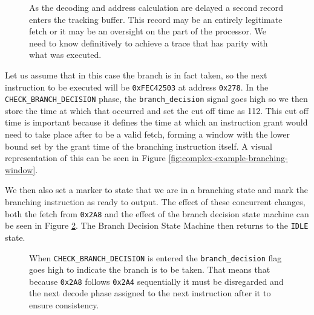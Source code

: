 \begin{figure}[htbp]
	
	\caption{As the decoding and address calculation are delayed a second record enters the tracking buffer. This record may be an entirely legitimate fetch or it may be an oversight on the part of the processor. We need to know definitively to achieve a trace that has parity with what was executed.}
	\label{fig:complex-example-step-2}
\end{figure} 


Let us assume that in this case the branch is in fact taken, so the next instruction to be executed will be \texttt{0xFEC42503} at address \texttt{0x278}. In the \texttt{CHECK\_BRANCH\_DECISION} phase, the \texttt{branch\_decision} signal goes high so we then store the time at which that occurred and set the cut off time as 112. This cut off time is important because it defines the time at which an instruction grant would need to take place after to be a valid fetch, forming a window with the lower bound set by the grant time of the branching instruction itself. A visual representation of this can be seen in Figure \ref{fig:complex-example-branching-window}.

\begin{sidewaysfigure}
	
	\caption{The highlighted region indicates the region within which any successful fetches should be ignored. It ranges from the cycle after the grant of the branching instruction to the cycle in which the branch decision signal goes high. Now because the grant signal for \texttt{0x2A8} falls in this window it must be disregarded.}
	\label{fig:complex-example-branching-window}	
\end{sidewaysfigure}


We then also set a marker to state that we are in a branching state and mark the branching instruction as ready to output. The effect of these concurrent changes, both the fetch from \texttt{0x2A8} and the effect of the branch decision state machine can be seen in Figure \ref{fig:complex-example-step-3}. The Branch Decision State Machine then returns to the \texttt{IDLE} state.

\begin{figure}[htbp]
	\begin{subfigure}{\linewidth}
		
	\end{subfigure}
	\begin{subfigure}{\linewidth}
		
	\end{subfigure}
	\caption{When \texttt{CHECK\_BRANCH\_DECISION} is entered the \texttt{branch\_decision} flag goes high to indicate the branch is to be taken. That means that because \texttt{0x2A8} follows \texttt{0x2A4} sequentially it must be disregarded and the next decode phase assigned to the next instruction after it to ensure consistency.}
	\label{fig:complex-example-step-3}
\end{figure} 

